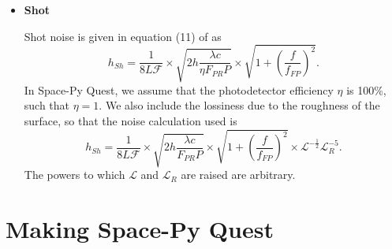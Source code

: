 \documentclass{article}
\begin{document}
\begin{itemize}
\begin{itemize}
    \item \textbf{Shot} \par
    Shot noise is given in equation (11) of \cite{VIRGO} as
    \begin{equation}
    h_{Sh} = \frac{1}{8L\mathcal{F}}\times\sqrt{2h\frac{\lambda c}{\eta F_{PR}P}}\times\sqrt{1 + \left(\frac{f}{f_{FP}}\right)^2}.
    \end{equation}
    In Space-Py Quest, we assume that the photodetector efficiency $\eta$ is 100\%, such that $\eta = 1$. We also include the lossiness due to the roughness of the surface, so that the noise calculation used is
    \begin{equation}
    \label{eqn::shot}
    h_{Sh} = \frac{1}{8L\mathcal{F}}\times\sqrt{2h\frac{\lambda c}{F_{PR}P}}\times\sqrt{1 + \left(\frac{f}{f_{FP}}\right)^2}\times\mathcal{L}^{-\frac{1}{2}}\mathcal{L}_R^{-5}.
    \end{equation}
    The powers to which $\mathcal{L}$ and $\mathcal{L}_R$ are raised are arbitrary.
    \end{itemize}
\end{itemize}
\clearpage
\section{Making Space-Py Quest}
\label{sec:making}
\end{document}
